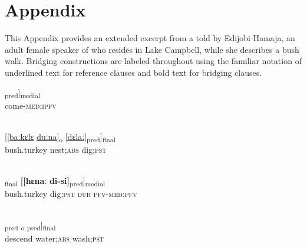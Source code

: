 \documentclass[output=paper]{LSP/langsci}
\begin{document}
\section*{Appendix}
 \setcounter{equation}{0}
This Appendix provides an extended excerpt from a  told by Edijobi Hamaja, an adult
female speaker of  who resides in Lake Campbell, while she describes a bush walk. Bridging
constructions are labeled throughout using the familiar notation of underlined text for reference clauses
and bold text for bridging clauses.

\begin{appendixexe}
\ex \label{Aiex:App21}
\gll [[jaː-nɛː]\textsubscript{pred}]\textsubscript{medial}\\
come-\textsc{med};\textsc{ipfv}\\
\glt {}\\
\end{appendixexe}

\begin{appendixexe}
\ex \label{Aiex:App22}	
\gll \underline{[[baːkɛlɛ}	\underline{duːna]}\textsubscript{o}	\underline{[dɛlaː]}\textsubscript{pred}]\textsubscript{final}\\
bush.turkey	nest;\textsc{abs}	dig;\textsc{pst}\\
‎\glt {}\\
\end{appendixexe}

\begin{appendixexe}
\ex \label{Aiex:App23}
\textsubscript{final}	\textbf{[[hɛnaː}	\textbf{di-si]}\textsubscript{pred}]\textsubscript{medial}\\
bush.turkey	dig;\textsc{pst}		\textsc{dur}	\textsc{pfv}-\textsc{med};\textsc{pfv}\\
‎‎\glt {}\\
\end{appendixexe}

\begin{appendixexe}
\ex \label{Aiex:App24}
\gll [[tilaː]\textsubscript{pred}	\underline{\smash{[haːnaː]}}\textsubscript{o}	\underline{\smash{[muːduː]}}\textsubscript{pred}]\textsubscript{final}\\
descend	water;\textsc{abs}	wash;\textsc{pst}\\
\glt {}\\
\end{appendixexe}
\end{document}
